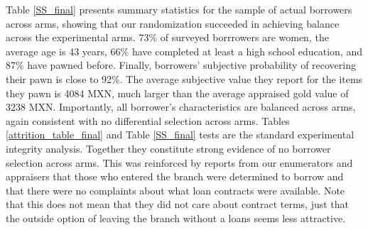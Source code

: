 \documentclass[12pt, a4paper]{article}
\begin{document}
Table \ref{SS_final} presents summary statistics for the sample of actual borrowers across arms, showing that our randomization succeeded in achieving balance across the experimental arms. %
73\% of surveyed borrrowers are women, the average age is 43 years, 66\% have completed at least a high school education, and 87\% have pawned before. Finally, borrowers' subjective probability of recovering their pawn is close to 92\%. The average subjective value they report for the items they pawn is 4084 MXN, much larger than the average appraised gold value of 3238 MXN. %
Importantly, all borrower's characteristics are balanced across arms, again consistent with no differential selection across arms. Tables \ref{attrition_table_final} and Table \ref{SS_final}  tests are the standard experimental integrity analysis. Together they constitute strong evidence of no borrower selection across arms. This was reinforced by reports from our enumerators and appraisers that those who entered the branch were determined to borrow and that there were no complaints about what loan contracts were available. Note that this does not mean that they did not care about contract terms, just that the outside option of leaving the branch without a loans seems less attractive.
\end{document}
